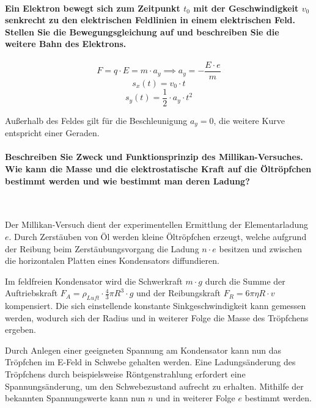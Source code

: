 \documentclass[a4paper, 11pt, ngerman, parskip=half-]{scrartcl}
\begin{document}
\paragraph{Ein Elektron bewegt sich zum Zeitpunkt $t_0$ mit der Geschwindigkeit $v_0$ senkrecht zu
    den elektrischen Feldlinien in einem elektrischen Feld. Stellen Sie die Bewegungsgleichung auf und
    beschreiben Sie die weitere Bahn des Elektrons.}

\begin{equation}
    F = q \cdot E = m \cdot a_y
    \implies
    a_y = - \frac{E \cdot e}{m}
\end{equation}
\begin{equation}
    s_x(t) = v_0 \cdot t
\end{equation}
\begin{equation}
    s_y(t) = \frac{1}{2} \cdot a_y \cdot t^2
\end{equation}

Außerhalb des Feldes gilt für die Beschleunigung $a_y = 0$, die weitere Kurve entspricht einer
Geraden.

\paragraph{Beschreiben Sie Zweck und Funktionsprinzip des Millikan-Versuches. Wie kann die Masse und
    die elektrostatische Kraft auf die Öltröpfchen bestimmt werden und wie bestimmt man deren Ladung?} ~

Der Millikan-Versuch dient der experimentellen Ermittlung der Elementarladung $e$. Durch Zerstäuben
von Öl werden kleine Öltröpfchen erzeugt, welche aufgrund der Reibung beim Zerstäubungsvorgang die
Ladung $n \cdot e$ besitzen und zwischen die horizontalen Platten eines Kondensators diffundieren.

Im feldfreien Kondensator wird die Schwerkraft $m \cdot g$ durch die Summe der Auftriebskraft
$F_A = \rho_{Luft} \cdot \frac{4}{3} \pi R^3 \cdot g$ und der Reibungskraft
$F_R = 6 \pi \eta R \cdot v$ kompensiert. Die sich einstellende konstante Sinkgeschwindigkeit kann
gemessen werden, wodurch sich der Radius und in weiterer Folge die Masse des Tröpfchens ergeben.

Durch Anlegen einer geeigneten Spannung am Kondensator kann nun das Tröpfchen im E-Feld in Schwebe
gehalten werden. Eine Ladungsänderung des Tröpfchens durch beispielsweise Röntgenstrahlung erfordert
eine Spannungsänderung, um den Schwebezustand aufrecht zu erhalten. Mithilfe der bekannten
Spannungswerte kann nun $n$ und in weiterer Folge $e$ bestimmt werden.
\end{document}
